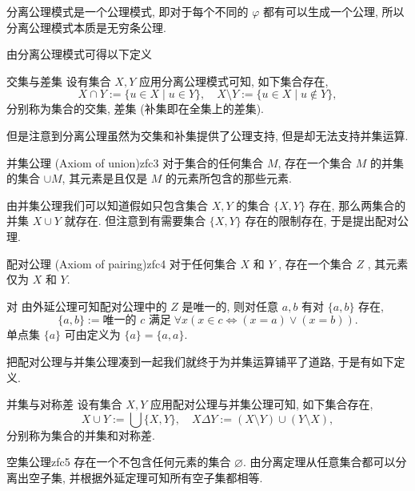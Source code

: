 \documentclass[cn,toc=twocol]{elegantbook}
\begin{document}
\begin{remark}
分离公理模式是一个公理模式, 即对于每个不同的 $\varphi$ 都有可以生成一个公理, 所以分离公理模式本质是无穷条公理.	
\end{remark}

由分离公理模式可得以下定义

\begin{definition}{交集与差集}
	设有集合 $X, Y$ 应用分离公理模式可知, 如下集合存在,
	\[
		X \cap Y := \{u \in X \mid u \in Y\},\quad X\setminus Y := \{u \in X \mid u \notin Y\},
	\]
	分别称为集合的交集, 差集 (补集即在全集上的差集).
\end{definition}
	
但是注意到分离公理虽然为交集和补集提供了公理支持, 但是却无法支持并集运算.
	
\begin{axiom}{并集公理 (Axiom of union)}{zfc3}
	对于集合的任何集合 $M$, 存在一个集合 $M$ 的并集的集合 $\cup M$, 其元素是且仅是 $M$ 的元素所包含的那些元素.
\end{axiom}
	
由并集公理我们可以知道假如只包含集合 $X, Y$ 的集合 $\{X, Y\}$ 存在, 那么两集合的并集 $X \cup Y$ 就存在. 但注意到有需要集合 $\{X, Y\}$ 存在的限制存在, 于是提出配对公理.

\begin{axiom}{配对公理 (Axiom of pairing)}{zfc4}
	对于任何集合 $X$ 和 $Y$ , 存在一个集合 $Z$ , 其元素仅为 $X$ 和 $Y$.
\end{axiom}

\begin{definition}{对}
	由外延公理可知配对公理中的 $Z$ 是唯一的, 则对任意 $a, b$ 有对 $\{a,b\}$ 存在,
	\[
		\{a,b\} := \text{唯一的 $c$ 满足}\; \forall x(x \in c \iff (x = a) \lor (x = b)).
	\]
	单点集 $\{a\}$ 可由定义为 $\{a\} = \{a, a\}$.
\end{definition}
	
把配对公理与并集公理凑到一起我们就终于为并集运算铺平了道路, 于是有如下定义.

\begin{definition}{并集与对称差}
	设有集合 $X, Y$ 应用配对公理与并集公理可知, 如下集合存在,
	\[
		X \cup Y := \bigcup\{X,Y\}, \quad X \Delta Y := (X \setminus Y) \cup (Y \setminus X),
	\]
	分别称为集合的并集和对称差.
\end{definition}

\begin{axiom}{空集公理}{zfc5}
	存在一个不包含任何元素的集合 $\varnothing$. 由分离定理从任意集合都可以分离出空子集, 并根据外延定理可知所有空子集都相等.
\end{axiom}
\end{document}

